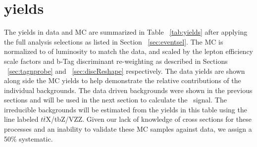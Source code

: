          
	\section{yields}
	The yields in data and MC are summarized in Table ~\ref{tab:yields} after applying the full analysis selections as listed in Section ~\ref{sec:eventsel}. The MC is normalized to \intLumi of luminosity to match the data, and scaled by the lepton efficiency scale factors and b-Tag discriminant re-weighting as described in Sections ~\ref{sec:tagnprobe} and ~\ref{sec:discReshape} respectively. The data yields are shown along side the MC yields to help demonstrate the relative contributions of the individual backgrounds. The data driven backgrounds were shown in the previous sections and will be used in the next section to calculate the \ttZ \ signal. The irreducible backgrounds will be estimated from the yields in this table using the line labeled $t\overline{t}$X/tbZ/VZZ. Given our lack of knowledge of cross sections for these processes and an inability to validate these MC samples against data, we assign a 50\% systematic.

